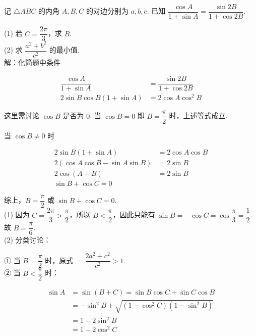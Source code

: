 \documentclass[UTF8]{ctexart}
\newcommand{\lt}{<}
\newcommand{\gt}{>}
\begin{document}
\thispagestyle{empty}
\pagestyle{empty}

\noindent 记 $\triangle ABC$ 的内角 $A,B,C$ 的对边分别为 $a,b,c$. 已知 $\dfrac{\cos A}{1+\sin A}=\dfrac{\sin 2B}{1+\cos 2B}$.

\noindent (1) 若 $C=\dfrac{2 \pi}{3}$，求 $B$. \\

\noindent (2) 求 $\dfrac{a^2+b^2}{c^2}$ 的最小值. \\

\noindent 解：化简题中条件

\begin{align*}
\dfrac{\cos A}{1+\sin A} &= \dfrac{\sin 2B}{1+\cos 2B} \\
2 \sin B \cos B(1+ \sin A) &= 2 \cos A \cos ^2 B
\end{align*}

\noindent 这里需讨论 $\cos B$ 是否为 $0$. 当 $\cos B=0$ 即 $B=\dfrac{\pi}{2}$ 时，上述等式成立.

\noindent 当 $\cos B \neq 0$ 时

\begin{align*}
2 \sin B(1+ \sin A) &= 2 \cos A \cos B \\
2(\cos A \cos B-\sin A \sin B) &= 2 \sin B \\
2 \cos(A+B) &= 2 \sin B \\
\sin B+\cos C=0
\end{align*}

\noindent 综上，$B=\dfrac{\pi}{2}$ 或 $\sin B+\cos C=0$. \\

\noindent (1) 因为 $C=\dfrac{2 \pi}{3} \gt \dfrac{\pi}{2}$，所以 $B \lt \dfrac{\pi}{2}$，因此只能有 $\sin B=-\cos C=\cos \dfrac{\pi}{3}=\dfrac{1}{2}$. \\

\noindent 故 $B=\dfrac{\pi}{6}$. \\

\noindent (2) 分类讨论：

\noindent ① 当 $B=\dfrac{\pi}{2}$ 时，原式 $=\dfrac{2a^2+c^2}{c^2} \gt 1$. \\

\noindent ② 当 $B \lt \dfrac{\pi}{2}$ 时：

\begin{align*}
\sin A &= \sin(B+C)=\sin B \cos C+\sin C \cos B \\
&= -\sin^2 B+\sqrt{(1-\cos^2 C)(1-\sin^2 B)} \\
&= 1-2 \sin^2 B \\
&= 1-2 \cos^2 C \\
\end{align*}
\end{document}
